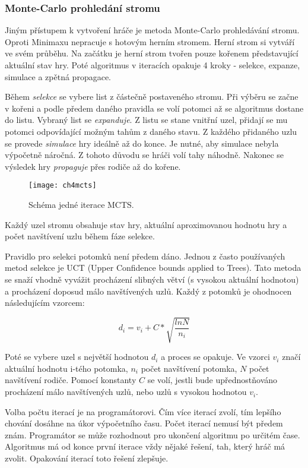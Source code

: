 \subsubsection{Monte-Carlo prohledání stromu}

Jiným přístupem k vytvoření hráče je metoda Monte-Carlo prohledávání stromu. Oproti Minimaxu nepracuje s hotovým herním stromem. Herní strom si vytváří ve svém průběhu. Na začátku je herní strom tvořen pouze kořenem představující aktuální stav hry. Poté algoritmus v iteracích opakuje 4 kroky - selekce, expanze, simulace a zpětná propagace. 

Během \emph{selekce} se vybere list z částečně postaveného stromu. Při výběru se začne v kořeni a podle předem daného pravidla se volí potomci až se algoritmus dostane do listu. Vybraný list se \emph{expanduje}. Z listu se stane vnitřní uzel, přidají se mu potomci odpovídající možným tahům z daného stavu. Z každého přidaného uzlu se provede \emph{simulace} hry ideálně až do konce. Je nutné, aby simulace nebyla výpočetně náročná. Z tohoto důvodu se hráči volí tahy náhodně. Nakonec se výsledek hry \emph{propaguje} přes rodiče až do kořene.

\begin{figure}
  \centering
  \texttt{[image: ch4mcts]}
	\caption{ Schéma jedné iterace MCTS. }
	\label{fig-ch4mcts}
\end{figure}

Každý uzel stromu obsahuje stav hry, aktuální aproximovanou hodnotu hry a počet navštívení uzlu během fáze selekce. 

Pravidlo pro selekci potomků není předem dáno. Jednou z často používaných metod selekce je UCT (Upper
Confidence bounds applied to Trees). Tato metoda se snaží vhodně vyvážit procházení slibných větví (s vysokou aktuální hodnotou) a procházení doposud málo navštívených uzlů. Každý z potomků je ohodnocen následujícím vzorcem:

	\[
	d_i = v_i + C * \sqrt{\frac{ln N}{n_i}}
\]

Poté se vybere uzel s největší hodnotou $d_i$ a proces se opakuje. Ve vzorci $v_i$ značí aktuální hodnotu i-tého potomka, $n_i$ počet navštívení potomka, $N$ počet navštívení rodiče. Pomocí konstanty $C$ se volí, jestli bude upřednostňováno procházení málo navštívených uzlů, nebo uzlů s vysokou hodnotou $v_i$. 

Volba počtu iterací je na programátorovi. Čím více iterací zvolí, tím lepšího chování dosáhne na úkor výpočetního času. Počet iterací nemusí být předem znám. Programátor se může rozhodnout pro ukončení algoritmu po určitém čase. Algoritmus má od konce první iterace vždy nějaké řešení, tah, který hráč má zvolit. Opakování iterací toto řešení zlepšuje.

